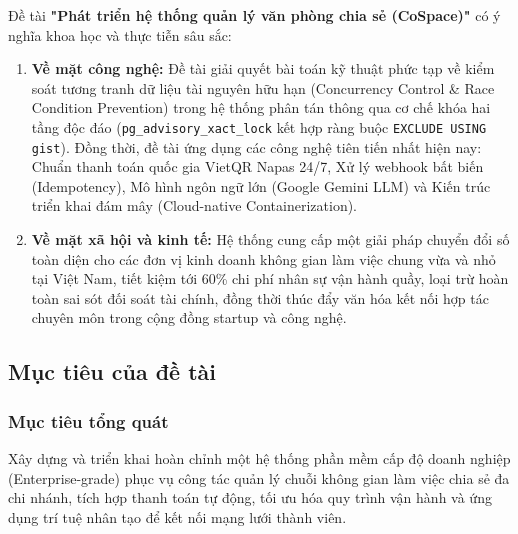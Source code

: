 Đề tài \textbf{"Phát triển hệ thống quản lý văn phòng chia sẻ (CoSpace)"} có ý nghĩa khoa học và thực tiễn sâu sắc:
\begin{enumerate}
    \item \textbf{Về mặt công nghệ:} Đề tài giải quyết bài toán kỹ thuật phức tạp về kiểm soát tương tranh dữ liệu tài nguyên hữu hạn (Concurrency Control \& Race Condition Prevention) trong hệ thống phân tán thông qua cơ chế khóa hai tầng độc đáo (\texttt{pg\_advisory\_xact\_lock} kết hợp ràng buộc \texttt{EXCLUDE USING gist}). Đồng thời, đề tài ứng dụng các công nghệ tiên tiến nhất hiện nay: Chuẩn thanh toán quốc gia VietQR Napas 24/7, Xử lý webhook bất biến (Idempotency), Mô hình ngôn ngữ lớn (Google Gemini LLM) và Kiến trúc triển khai đám mây (Cloud-native Containerization).
    \item \textbf{Về mặt xã hội và kinh tế:} Hệ thống cung cấp một giải pháp chuyển đổi số toàn diện cho các đơn vị kinh doanh không gian làm việc chung vừa và nhỏ tại Việt Nam, tiết kiệm tới 60\% chi phí nhân sự vận hành quầy, loại trừ hoàn toàn sai sót đối soát tài chính, đồng thời thúc đẩy văn hóa kết nối hợp tác chuyên môn trong cộng đồng startup và công nghệ.
\end{enumerate}

\subsection{Mục tiêu của đề tài}

\subsubsection{Mục tiêu tổng quát}
Xây dựng và triển khai hoàn chỉnh một hệ thống phần mềm cấp độ doanh nghiệp (Enterprise-grade) phục vụ công tác quản lý chuỗi không gian làm việc chia sẻ đa chi nhánh, tích hợp thanh toán tự động, tối ưu hóa quy trình vận hành và ứng dụng trí tuệ nhân tạo để kết nối mạng lưới thành viên.

